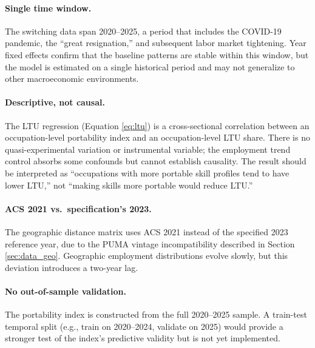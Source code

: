 \documentclass[12pt]{article}
\begin{document}
\paragraph{Single time window.} The switching data span 2020--2025, a period that includes the COVID-19 pandemic, the ``great resignation,'' and subsequent labor market tightening. Year fixed effects confirm that the baseline patterns are stable within this window, but the model is estimated on a single historical period and may not generalize to other macroeconomic environments.

\paragraph{Descriptive, not causal.} The LTU regression (Equation \ref{eq:ltu}) is a cross-sectional correlation between an occupation-level portability index and an occupation-level LTU share. There is no quasi-experimental variation or instrumental variable; the employment trend control absorbs some confounds but cannot establish causality. The result should be interpreted as ``occupations with more portable skill profiles tend to have lower LTU,'' not ``making skills more portable would reduce LTU.''

\paragraph{ACS 2021 vs.\ specification's 2023.} The geographic distance matrix uses ACS 2021 instead of the specified 2023 reference year, due to the PUMA vintage incompatibility described in Section \ref{sec:data_geo}. Geographic employment distributions evolve slowly, but this deviation introduces a two-year lag.

\paragraph{No out-of-sample validation.} The portability index is constructed from the full 2020--2025 sample. A train-test temporal split (e.g., train on 2020--2024, validate on 2025) would provide a stronger test of the index's predictive validity but is not yet implemented.
\end{document}
